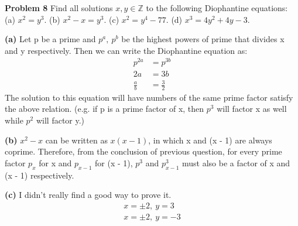 \documentclass[12pt,letterpaper]{hmcpset}
\begin{document}
\begin{problem}
\textbf{Problem 8} Find all solutions $x,y\in \mathbb{Z}$ to the following Diophantine equations:
\newline(a) $x^{2} = y^{3}$.
\newline(b) $x^{2} - x = y^{3}$.
\newline(c) $x^{2} = y^{4} - 77$.
\newline(d) $x^{3} = 4y^{2} +4y - 3$.
\end{problem}

\begin{solution}
\textbf{(a)} Let p be a prime and $p^{a},\ p^{b}$ be the highest powers of prime that divides x and y respectively. Then we can write the Diophantine equation as:
\begin{align*}
p^{2a}	&= p^{3b}	\\
2a		&= 3b	\\
\frac{a}{b}	&= \frac{3}{2}
\end{align*}
The solution to this equation will have numbers of the same prime factor satisfy the above relation. (e.g. if p is a prime factor of x, then $p^{3}$ will factor x as well while $p^{2}$ will factor y.)
\end{solution}

\begin{solution}
\textbf{(b)} $x^{2}-x$ can be written as $x(x-1)$, in which x and (x - 1) are always coprime. Therefore, from the conclusion of previous question, for every prime factor $p_x$ for x and $p_{x-1}$ for (x - 1), $p^{3}$ and $p_{x-1}^{3}$ must also be a factor of x and (x - 1) respectively.
\end{solution}

\begin{solution}
\textbf{(c)} I didn't really find a good way to prove it.
\begin{align*}
x = \pm 2,\ y=3	\\
x = \pm 2,\ y=-3
\end{align*}
\end{solution}

\begin{solution}

\end{solution}

\end{document}

